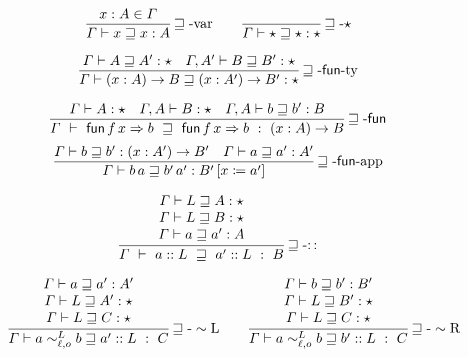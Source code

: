 \begin{figure}

  \begin{align*}
   \frac{x:A\in\varGamma}{\varGamma\vdash x\sqsupseteq x:A}\rulename{\sqsupseteq-var}
    \quad & \quad 
    \frac{\ }{\varGamma\vdash\star\sqsupseteq\star:\star}\rulename{\sqsupseteq-\star}
    \\
  \end{align*}
  
  \[
  \frac{
  \varGamma\vdash A\sqsupseteq A':\star \quad
  \varGamma,A'\vdash B\sqsupseteq B':\star
  }{
    \varGamma\vdash\left(x:A\right)\rightarrow B\sqsupseteq\left(x:A'\right)\rightarrow B':\star
  }\operatorname{\sqsupseteq-\mathsf{fun}-ty}
  \]
  
  \[
  \frac{
  \varGamma\vdash A:\star\quad\varGamma,A\vdash B:\star \quad
  \varGamma,A\vdash b\sqsupseteq b':B
  }{
    \varGamma\ \vdash\ \mathsf{fun}\,f\,x\Rightarrow b\ \sqsupseteq\ \mathsf{fun}\,f\,x\Rightarrow b\ :\ \left(x:A\right)\rightarrow B
  }\rulename{\sqsupseteq-\mathsf{fun}}
  \]
  \[
  \frac{
  \varGamma\vdash b\sqsupseteq b':\left(x:A'\right)\rightarrow B' \quad
  \varGamma\vdash a\sqsupseteq a':A'
  }{
    \varGamma\vdash b\,a\sqsupseteq b'\,a':B'\left[x\coloneqq a'\right]
  }\operatorname{\sqsupseteq-\mathsf{fun}-app}
  \]
  
  \[
  \frac{\begin{array}{c}
    \varGamma\vdash L\sqsupseteq A:\star\\
    \varGamma\vdash L\sqsupseteq B:\star\\
    \varGamma\vdash a\sqsupseteq a':A
    \end{array}}{\varGamma\ \vdash\ a::L\ \sqsupseteq\ a'::L\ :\ B}\rulename{\sqsupseteq-::}
  \]
  
  \begin{align*}
    \frac{\begin{array}{c}
    \varGamma\vdash a\sqsupseteq a':A'\\
    \varGamma\vdash L\sqsupseteq A':\star\\
    \varGamma\vdash L\sqsupseteq C:\star
    \end{array}}{\varGamma\vdash a\sim_{\ell,o}^{L}b\sqsupseteq a'::L\ :\ C}\rulename{\sqsupseteq-\sim L}
    \quad & \quad 
    \frac{\begin{array}{c}
    \varGamma\vdash b\sqsupseteq b':B'\\
    \varGamma\vdash L\sqsupseteq B':\star\\
    \varGamma\vdash L\sqsupseteq C:\star
    \end{array}}{\varGamma\vdash a\sim_{\ell,o}^{L}b\sqsupseteq b'::L\ :\ C}\rulename{\sqsupseteq-\sim R}
  \\
  \end{align*}
  

\end{figure}

